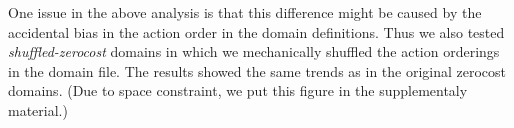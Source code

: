 One issue in the above analysis is that this difference might
be caused by the accidental bias in the action order in the
domain definitions.
Thus we also tested \emph{shuffled-zerocost} domains
in which we mechanically shuffled the action orderings in the
domain file. The results showed the same trends as in the original
zerocost domains. (Due to space constraint, we put this figure in the
supplementaly material.)

